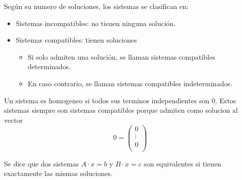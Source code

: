 Según su numero de soluciones, los sistemas se clasifican en:
\begin{itemize}
	\item Sistemas incompatibles: no tienen ninguna solución.
	\item Sistemas compatibles: tienen soluciones \begin{itemize}
		      \item Si solo admiten una solución, se llaman sistemas compatibles determinados.
		      \item En caso contrario, se llaman sistemas compatibles indeterminados.
	      \end{itemize}
\end{itemize}

Un sistema es homogeneo si todos sus terminos independientes son 0. Estos sistemas siempre son sistemas compatibles porque admiten como solucion al vector
\[
	0 = \begin{pmatrix}
		0      \\
		\vdots \\
		0      \\
	\end{pmatrix}
\]
\begin{definition}
	Se dice que dos sistemas \(A \cdot x = b \) y \(B \cdot x = c \) son equivalentes si tienen exactamente las mismas soluciones.
\end{definition}

